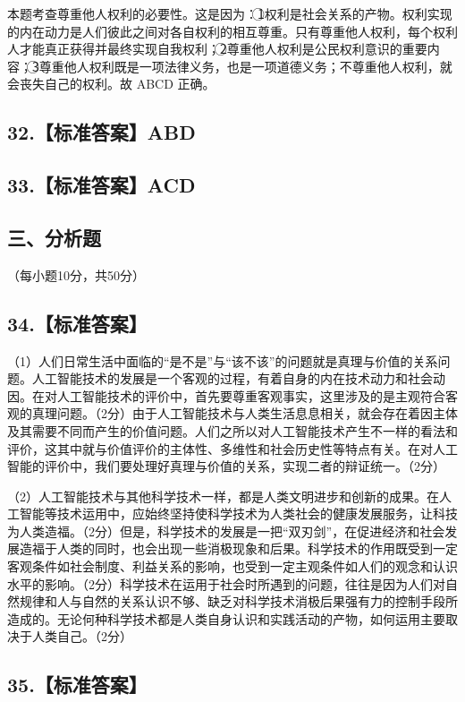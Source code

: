 \documentclass[UTF8,11pt]{ctexart}
\begin{document}
本题考查尊重他人权利的必要性。这是因为：\textcircled{1}权利是社会关系的产物。权利实现的内在动力是人们彼此之间对各自权利的相互尊重。只有尊重他人权利，每个权利人才能真正获得并最终实现自我权利；\textcircled{2}尊重他人权利是公民权利意识的重要内容；\textcircled{3}尊重他人权利既是一项法律义务，也是一项道德义务；不尊重他人权利，就会丧失自己的权利。故 ABCD 正确。


\subsection*{32.【标准答案】ABD}

\subsection*{33.【标准答案】ACD}

\subsection*{三、分析题}

（每小题10分，共50分）


\subsection*{34.【标准答案】}

（1）人们日常生活中面临的“是不是”与“该不该”的问题就是真理与价值的关系问题。人工智能技术的发展是一个客观的过程，有着自身的内在技术动力和社会动因。在对人工智能技术的评价中，首先要尊重客观事实，这里涉及的是主观符合客观的真理问题。（2分）由于人工智能技术与人类生活息息相关，就会存在着因主体及其需要不同而产生的价值问题。人们之所以对人工智能技术产生不一样的看法和评价，这其中就与价值评价的主体性、多维性和社会历史性等特点有关。在对人工智能的评价中，我们要处理好真理与价值的关系，实现二者的辩证统一。（2分）


（2）人工智能技术与其他科学技术一样，都是人类文明进步和创新的成果。在人工智能等技术运用中，应始终坚持使科学技术为人类社会的健康发展服务，让科技为人类造福。（2分）但是，科学技术的发展是一把“双刃剑”，在促进经济和社会发展造福于人类的同时，也会出现一些消极现象和后果。科学技术的作用既受到一定客观条件如社会制度、利益关系的影响，也受到一定主观条件如人们的观念和认识水平的影响。（2分）科学技术在运用于社会时所遇到的问题，往往是因为人们对自然规律和人与自然的关系认识不够、缺乏对科学技术消极后果强有力的控制手段所造成的。无论何种科学技术都是人类自身认识和实践活动的产物，如何运用主要取决于人类自己。（2分）


\subsection*{35.【标准答案】}
\end{document}
